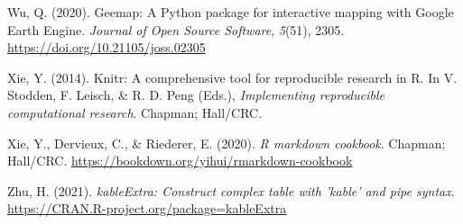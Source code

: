 \documentclass[spanish]{article}
\newlength{\cslhangindent}
\newlength{\cslentryspacingunit} %
\newenvironment{CSLReferences}[2] %
 {%
  \setlength{\parindent}{0pt}
  \ifodd #1
  \let\oldpar\par
  \def\par{\hangindent=\cslhangindent\oldpar}
  \fi
  \setlength{\parskip}{#2\cslentryspacingunit}
 }%
 {}
\begin{document}
\begin{CSLReferences}{1}{0}
\leavevmode{}%
Wu, Q. (2020). Geemap: {A} {Python} package for interactive mapping with
{Google} {Earth} {Engine}. \emph{Journal of Open Source Software},
\emph{5}(51), 2305. \url{https://doi.org/10.21105/joss.02305}

\leavevmode{}%
Xie, Y. (2014). Knitr: A comprehensive tool for reproducible research in
{R}. In V. Stodden, F. Leisch, \& R. D. Peng (Eds.), \emph{Implementing
reproducible computational research}. Chapman; Hall/CRC.

\leavevmode{}%
Xie, Y., Dervieux, C., \& Riederer, E. (2020). \emph{R markdown
cookbook}. Chapman; Hall/CRC.
\url{https://bookdown.org/yihui/rmarkdown-cookbook}

\leavevmode{}%
Zhu, H. (2021). \emph{kableExtra: Construct complex table with 'kable'
and pipe syntax}. \url{https://CRAN.R-project.org/package=kableExtra}

\end{CSLReferences}



\end{document}
